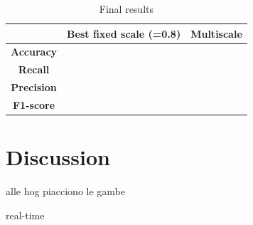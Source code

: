 \documentclass[a4paper, 11pt, onecolumn]{article} %
\begin{document}
\begin{table}[h!]
\centering
\begin{tabular}{c||c|c}
&\textbf{Best fixed scale (=0.8)} & \textbf{Multiscale}\\
\hline \hline 
\textbf{Accuracy} & & \\
\textbf{Recall} & & \\
\textbf{Precision} & & \\
\textbf{F1-score} & & \\
\end{tabular}
\caption{Final results}
\end{table}

\section{Discussion}\label{discussion}
alle hog piacciono le gambe

real-time
\end{document}
